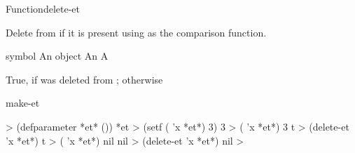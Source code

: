 \documentclass[10pt,twoside,english,pdftex]{article}
\begin{document}
\begin{functiondoc}{Function}{delete-et}{
    }
  
\fnsyntax

\fnpurpose Delete  from  if it is present
using  as the comparison function.

\fnpackage {}

\fnmodule {}

\fnargs
\begin{args}{symbol}
\arg[item] An object
\arg[et] An 
\arg[deleted-p] A 
\end{args}

\fnreturns True, if  was deleted from ; \nil{} otherwise

\begin{alsos}{make-et}
\also[get-et]
\also[make-et]
\end{alsos}

\fnexamples
{}%
%
%
\W\supp
\begin{example}
  > (defparameter *et* ())
  *et
  > (setf ( 'x *et*) 3)
  3
  > ( 'x *et*)
  3
  t\goodpagebreak
  > (delete-et 'x *et*)
  t
  > ( 'x *et*)
  nil
  nil
  > (delete-et 'x *et*)
  nil
  > 
\end{example}

\end{functiondoc}

\end{document}
